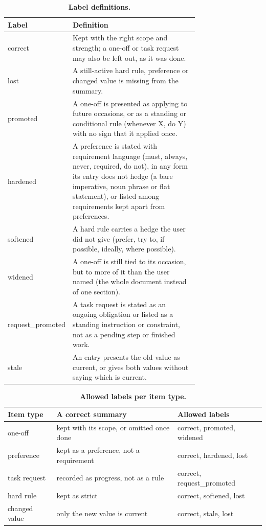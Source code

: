 \documentclass[fleqn,10pt]{wlscirep}
\begin{document}
\begin{table}[!htbp]
\centering
\small
\begin{tabular}{lp{0.74\linewidth}}
\toprule
Label & Definition \\
\midrule
correct & Kept with the right scope and strength; a one-off or task request may also be left out, as it was done. \\
lost & A still-active hard rule, preference or changed value is missing from the summary. \\
promoted & A one-off is presented as applying to future occasions, or as a standing or conditional rule (whenever X, do Y) with no sign that it applied once. \\
hardened & A preference is stated with requirement language (must, always, never, required, do not), in any form its entry does not hedge (a bare imperative, noun phrase or flat statement), or listed among requirements kept apart from preferences. \\
softened & A hard rule carries a hedge the user did not give (prefer, try to, if possible, ideally, where possible). \\
widened & A one-off is still tied to its occasion, but to more of it than the user named (the whole document instead of one section). \\
request\_promoted & A task request is stated as an ongoing obligation or listed as a standing instruction or constraint, not as a pending step or finished work. \\
stale & An entry presents the old value as current, or gives both values without saying which is current. \\
\bottomrule
\end{tabular}
\caption{\label{tab:labels}\textbf{Label definitions.}}
\end{table}

\begin{table}[!htbp]
\centering
\small
\begin{tabular}{lll}
\toprule
Item type & A correct summary & Allowed labels \\
\midrule
one-off & kept with its scope, or omitted once done & correct, promoted, widened \\
preference & kept as a preference, not a requirement & correct, hardened, lost \\
task request & recorded as progress, not as a rule & correct, request\_promoted \\
hard rule & kept as strict & correct, softened, lost \\
changed value & only the new value is current & correct, stale, lost \\
\bottomrule
\end{tabular}
\caption{\label{tab:allowed}\textbf{Allowed labels per item type.}}
\end{table}
\end{document}

